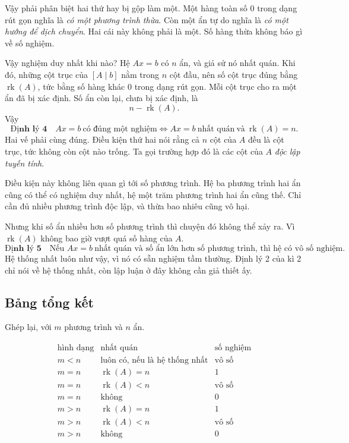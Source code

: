 \documentclass[12pt,a4paper]{article}
\begin{document}
Vậy phải phân biệt hai thứ hay bị gộp làm một. Một hàng toàn số \(0\) trong dạng rút gọn nghĩa là \emph{có một phương trình thừa}. Còn một ẩn tự do nghĩa là \emph{có một hướng để dịch chuyển}. Hai cái này không phải là một. Số hàng thừa không báo gì về số nghiệm.

Vậy nghiệm duy nhất khi nào? Hệ \(Ax=b\) có \(n\) ẩn, và giả sử nó nhất quán. Khi đó, những cột trục của \([A\mid b]\) nằm trong \(n\) cột đầu, nên số cột trục đúng bằng \(\operatorname{rk}(A)\), tức bằng số hàng khác \(0\) trong dạng rút gọn. Mỗi cột trục cho ra một ẩn đã bị xác định. Số ẩn còn lại, chưa bị xác định, là
$$
n-\operatorname{rk}(A).
$$
Vậy
$$
\textbf{Định lý 4}\quad Ax=b\ \text{có đúng một nghiệm}
\iff Ax=b\ \text{nhất quán}\ \text{và}\ \operatorname{rk}(A)=n.
$$
Hai vế phải cùng đúng. Điều kiện thứ hai nói rằng cả \(n\) cột của \(A\) đều là cột trục, tức không còn cột nào trống. Ta gọi trường hợp đó là các cột của \(A\) \emph{độc lập tuyến tính}.

Điều kiện này không liên quan gì tới số phương trình. Hệ ba phương trình hai ẩn cũng có thể có nghiệm duy nhất, hệ một trăm phương trình hai ẩn cũng thế. Chỉ cần đủ nhiều phương trình độc lập, và thừa bao nhiêu cũng vô hại.

Nhưng khi số ẩn nhiều hơn số phương trình thì chuyện đó không thể xảy ra. Vì \(\operatorname{rk}(A)\) không bao giờ vượt quá số hàng của \(A\).
$$
\textbf{Định lý 5}\quad \text{Nếu } Ax=b\ \text{nhất quán và số ẩn lớn hơn số phương trình, thì hệ có vô số nghiệm.}
$$
Hệ thống nhất luôn như vậy, vì nó có sẵn nghiệm tầm thường. Định lý 2 của kì 2 chỉ nói về hệ thống nhất, còn lập luận ở đây không cần giả thiết ấy.

\subsection{Bảng tổng kết}

Ghép lại, với \(m\) phương trình và \(n\) ẩn.

$$
\begin{array}{c|c|c}
\text{hình dạng} & \text{nhất quán} & \text{số nghiệm}\\ \hline
m<n & \text{luôn có, nếu là hệ thống nhất} & \text{vô số}\\
m=n & \operatorname{rk}(A)=n & 1\\
m=n & \operatorname{rk}(A)<n & \text{vô số}\\
m=n & \text{không} & 0\\
m>n & \operatorname{rk}(A)=n & 1\\
m>n & \operatorname{rk}(A)<n & \text{vô số}\\
m>n & \text{không} & 0
\end{array}
$$
\end{document}
